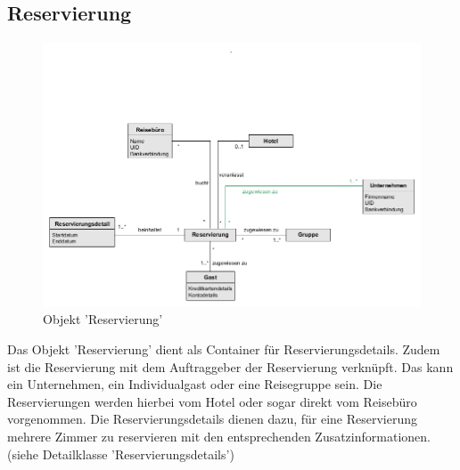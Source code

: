 \documentclass[../../Pflichtenheft.tex]{subfiles}
\begin{document}
    \subsection{Reservierung}
        \begin{figure}[ht!]
            \begin{center}
                \includegraphics[width=0.7\linewidth]{assets/reservierung.png}
                \caption{Objekt 'Reservierung'} \label{reservierung_model}
            \end{center}
        \end{figure}Das Objekt 'Reservierung' dient als Container für Reservierungsdetails. Zudem
    ist die Reservierung mit dem Auftraggeber der Reservierung verknüpft. Das kann
    ein Unternehmen, ein Individualgast oder eine Reisegruppe sein. Die Reservierungen
    werden hierbei vom Hotel oder sogar direkt vom Reisebüro vorgenommen. Die Reservierungsdetails
    dienen dazu, für eine Reservierung mehrere Zimmer zu reservieren mit den entsprechenden Zusatzinformationen.
    (siehe Detailklasse 'Reservierungsdetails')
\end{document}
